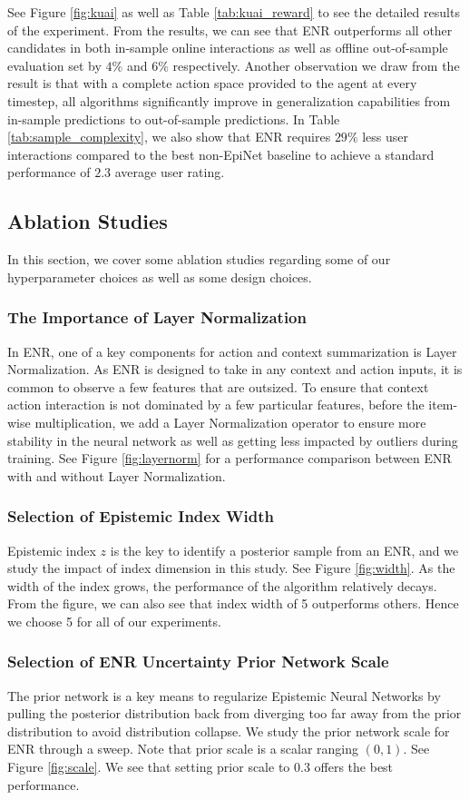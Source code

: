 See Figure \ref{fig:kuai} as well as Table \ref{tab:kuai_reward} to see the detailed results of the experiment. From the results, we can see that ENR outperforms all other candidates in both in-sample online interactions as well as offline out-of-sample evaluation set by $4\%$ and $6\%$ respectively. Another observation we draw from the result is that with a complete action space provided to the agent at every timestep, all algorithms significantly improve in generalization capabilities from in-sample predictions to out-of-sample predictions. In Table \ref{tab:sample_complexity}, we also show that ENR requires $29\%$ less user interactions compared to the best non-EpiNet baseline to achieve a standard performance of $2.3$ average user rating. 

\vspace{-0.1in}
\subsection{Ablation Studies}
In this section, we cover some ablation studies regarding some of our hyperparameter choices as well as some design choices.
\vspace{-0.05in}
\subsubsection{The Importance of Layer Normalization}
In ENR, one of a key components for action and context summarization is Layer Normalization. As ENR is designed to take in any context and action inputs, it is common to observe a few features that are outsized. To ensure that context action interaction is not dominated by a few particular features, before the item-wise multiplication, we add a Layer Normalization operator to ensure more stability in the neural network as well as getting less impacted by outliers during training. See Figure \ref{fig:layernorm} for a performance comparison between ENR with and without Layer Normalization.
\vspace{-0.05in}
\subsubsection{Selection of Epistemic Index Width}
Epistemic index $z$ is the key to identify a posterior sample from an ENR, and we study the impact of index dimension in this study. See Figure \ref{fig:width}. As the width of the index grows, the performance of the algorithm relatively decays. From the figure, we can also see that index width of 5 outperforms others. Hence we choose 5 for all of our experiments.
\vspace{-0.05in}
\subsubsection{Selection of ENR Uncertainty Prior Network Scale} 
The prior network is a key means to regularize Epistemic Neural Networks by pulling the posterior distribution back from diverging too far away from the prior distribution to avoid distribution collapse. We study the prior network scale for ENR through a sweep. Note that prior scale is a scalar ranging $(0, 1)$. See Figure \ref{fig:scale}. We see that setting prior scale to 0.3 offers the best performance.
